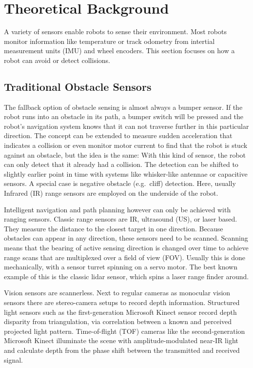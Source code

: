
\chapter{Theoretical Background}\label{theoretical-background}

A variety of sensors enable robots to sense their environment. Most
robots monitor information like temperature or track odometry from
intertial measurement units (IMU) and wheel encoders. This section
focuses on how a robot can avoid or detect collisions.

\section{Traditional Obstacle
Sensors}\label{traditional-obstacle-sensors}

The fallback option of obstacle sensing is almost always a bumper
sensor. If the robot runs into an obstacle in its path, a bumper switch
will be pressed and the robot's navigation system knows that it can not
traverse further in this particular direction. The concept can be
extended to measure sudden acceleration that indicates a collision or
even monitor motor current to find that the robot is stuck against an
obstacle, but the idea is the same: With this kind of sensor, the robot
can only detect that it already had a collision. The detection can be
shifted to slightly earlier point in time with systems like whisker-like
antennae or capacitive sensors\cite{Muhlbacher-Karrer2015}. A special
case is negative obstacle (e.g.~cliff) detection. Here, usually Infrared
(IR) range sensors are employed on the underside of the robot.

Intelligent navigation and path planning however can only be achieved
with ranging sensors. Classic range sensors are IR, ultrasound (US), or
laser based. They measure the distance to the closest target in one
direction. Because obstacles can appear in any direction, these sensors
need to be scanned. Scanning means that the bearing of active sensing
direction is changed over time to achieve range scans that are
multiplexed over a field of view (FOV). Usually this is done
mechanically, with a sensor turret spinning on a servo motor. The best
known example of this is the classic lidar sensor, which spins a laser
range finder around.

Vision sensors are scannerless. Next to regular cameras as monocular
vision sensors there are stereo-camera setups to record depth
information. Structured light sensors such as the first-generation
Microsoft Kinect sensor record depth disparity from triangulation, via
correlation between a known and perceived projected light pattern.
Time-of-flight (TOF) cameras like the second-generation Microsoft Kinect
illuminate the scene with amplitude-modulated near-IR light and
calculate depth from the phase shift between the transmitted and
received signal\cite{Sarbolandi2015}.

